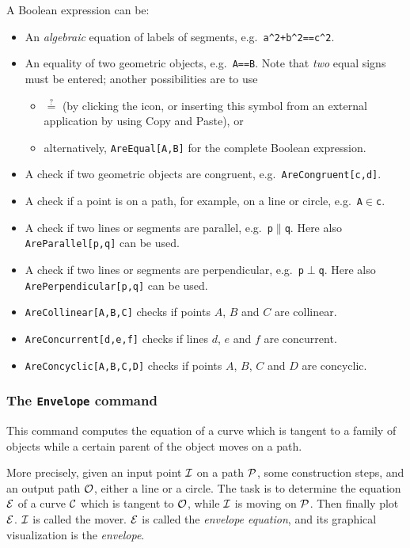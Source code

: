 \documentclass{article}
\begin{document}
A Boolean expression can be:
\begin{itemize}
\item An \textit{algebraic} equation of labels of segments, e.g.~\texttt{a\^{}2+b\^{}2==c\^{}2}.
\item An equality of two geometric objects, e.g.~\texttt{A==B}. Note that \textit{two} equal signs must be entered; another possibilities are to use
\begin{itemize}
    \item $\stackrel{?}{=}$ (by clicking the \framebox{$\alpha$} icon, or inserting this symbol from an external application by using Copy and Paste), or
    \item alternatively, \texttt{AreEqual[A,B]} for the complete Boolean expression.
\end{itemize}
\item A check if two geometric objects are congruent, e.g.~\texttt{AreCongruent[c,d]}.
\item A check if a point is on a path, for example, on a line or circle, e.g.~\texttt{A$\in$c}.
\item A check if two lines or segments are parallel, e.g.~\texttt{p$\parallel$q}. Here also \texttt{AreParallel[p,q]} can be used.
\item A check if two lines or segments are perpendicular, e.g.~\texttt{p$\perp$q}. Here also \texttt{ArePerpendicular[p,q]} can be used.
\item \texttt{AreCollinear[A,B,C]} checks if points $A$, $B$ and $C$ are collinear.
\item \texttt{AreConcurrent[d,e,f]} checks if lines $d$, $e$ and $f$ are concurrent.
\item \texttt{AreConcyclic[A,B,C,D]} checks if points $A$, $B$, $C$ and $D$ are concyclic.
\end{itemize}

\subsubsection{The \texttt{Envelope} command}

This command computes the equation of a curve which is tangent to a family of objects while a certain parent of the object moves on a path.

More precisely, given an input point $\cal{I}$ on a path $\cal{P}$, some construction steps, and an output path $\cal O$, either a line or a circle. The task is to determine the equation $\cal E$ of a curve $\cal C$ which is tangent to $\cal O$, while $\cal I$ is moving on $\cal P$. Then finally plot $\cal E$. $\cal I$ is called the mover. $\cal E$ is called the \textit{envelope equation}, and its graphical visualization is the \textit{envelope}.
\end{document}
